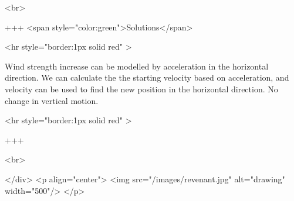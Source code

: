 <br>

+++ <span style="color:green">Solutions</span>

<hr style="border:1px solid red" >

Wind strength increase can be modelled by acceleration in the horizontal direction. We can calculate the the starting velocity based on acceleration, and velocity can be used to find the new position in the horizontal direction. 
No change in vertical motion.

<hr style="border:1px solid red" >

+++

<br>

</div>
<p align="center">
<img src="/images/revenant.jpg" alt="drawing" width="500"/>
</p>

